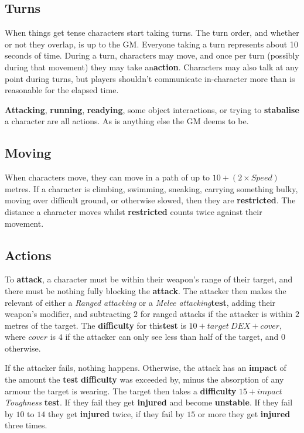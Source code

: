 \documentclass[11pt]{article}
\begin{document}
\begin{multicols}{3}
  \subsection*{Turns}

  When things get tense characters start taking turns. The turn order, and whether or not they overlap, is up to the GM. Everyone taking a turn represents about 10 seconds of time. During a turn, characters may move, and once per turn (possibly during that movement) they may take an ​\textbf{action​}. Characters may also talk at any point during turns, but players shouldn't communicate in-character more than is reasonable for the elapsed time.
  
  \textbf{Attacking}, \textbf{running}, \textbf{readying}, some object interactions, or trying to \textbf{stabalise} a character are all actions. As is anything else the GM deems to be.
  

  \subsection*{Moving}

  When characters move, they can move in a path of up to $10 + (2 \times Speed)$ metres. If a character is climbing, swimming, sneaking, carrying something bulky, moving over difficult ground, or otherwise slowed, then they are \textbf{restricted}. The distance a character moves whilst \textbf{restricted} counts twice against their movement.

  \subsection*{Actions}

  To \textbf{attack}, a character must be within their weapon's range of their target, and there must be nothing fully blocking the \textbf{attack}. The attacker then makes the relevant of either a \textit{​Ranged attacking​} or a \textit{​Melee attacking​​}  \textbf{test​}, adding their weapon's modifier, and subtracting $2$ for ranged attacks if the attacker is within $2$ metres of the target. The \textbf{difficulty} for this ​\textbf{test​} is $10 + target\:DEX + cover$, where $cover$ is $4$ if the attacker can only see less than half of the target, and $0$ otherwise.

  If the attacker fails, nothing happens. Otherwise, the attack has an \textbf{impact} of the amount the \textbf{test} \textbf{difficulty} was exceeded by, minus the absorption of any armour the target is wearing. The target then takes a \textbf{difficulty} $15 + impact$ \textit{Toughness} \textbf{test}. If they fail they get \textbf{injured} and become \textbf{unstable}. If they fail by $10$ to $14$ they get \textbf{injured} twice, if they fail by $15$ or more they get \textbf{injured} three times.


\end{multicols}
\end{document}
